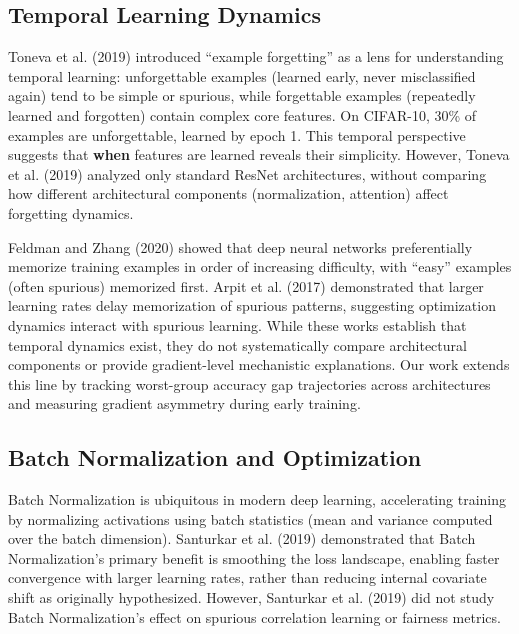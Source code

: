 \subsection{Temporal Learning Dynamics}

Toneva et al. (2019) \cite{toneva2018empirical} introduced ``example forgetting'' as a lens for understanding temporal learning: unforgettable examples (learned early, never misclassified again) tend to be simple or spurious, while forgettable examples (repeatedly learned and forgotten) contain complex core features. On CIFAR-10, 30\% of examples are unforgettable, learned by epoch 1. This temporal perspective suggests that \textbf{when} features are learned reveals their simplicity. However, Toneva et al. (2019) analyzed only standard ResNet architectures, without comparing how different architectural components (normalization, attention) affect forgetting dynamics.

Feldman and Zhang (2020) \cite{feldman2020neural} showed that deep neural networks preferentially memorize training examples in order of increasing difficulty, with ``easy'' examples (often spurious) memorized first. Arpit et al. (2017) \cite{arpit2017closer} demonstrated that larger learning rates delay memorization of spurious patterns, suggesting optimization dynamics interact with spurious learning. While these works establish that temporal dynamics exist, they do not systematically compare architectural components or provide gradient-level mechanistic explanations. Our work extends this line by tracking worst-group accuracy gap trajectories across architectures and measuring gradient asymmetry during early training.

\subsection{Batch Normalization and Optimization}

Batch Normalization \cite{ioffe2015batch} is ubiquitous in modern deep learning, accelerating training by normalizing activations using batch statistics (mean and variance computed over the batch dimension). Santurkar et al. (2019) \cite{santurkar2018does} demonstrated that Batch Normalization's primary benefit is smoothing the loss landscape, enabling faster convergence with larger learning rates, rather than reducing internal covariate shift as originally hypothesized. However, Santurkar et al. (2019) did not study Batch Normalization's effect on spurious correlation learning or fairness metrics.

